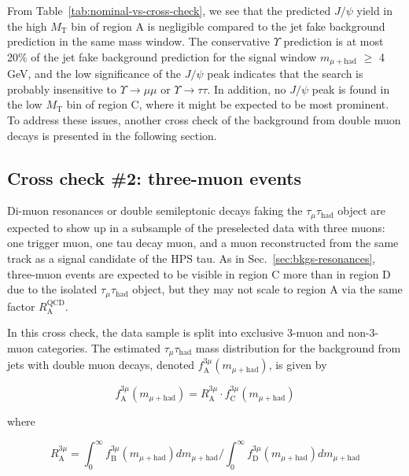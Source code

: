 From Table~\ref{tab:nominal-vs-cross-check}, we see that the predicted $J\slash\psi$ yield in the high $M_{\text{T}}$ bin of region A is negligible compared to the jet fake background prediction in the same mass window.  The conservative $\Upsilon$ prediction is at most 20\% of the jet fake background prediction for the signal window $m_{\mu+\text{had}}$ $\geq$ 4 GeV, and the low significance of the $J\slash\psi$ peak indicates that the search is probably insensitive to $\Upsilon\rightarrow\mu\mu$ or $\Upsilon\rightarrow\tau\tau$.  In addition, no $J\slash\psi$ peak is found in the low $M_{\text{T}}$ bin of region C, where it might be expected to be most prominent.  To address these issues, another cross check of the background from double muon decays is presented in the following section.

\subsection{Cross check \#2: three-muon events\label{sec:bkgs-3-muon}}

Di-muon resonances or double semileptonic decays faking the $\tau_{\mu}\tau_{\text{had}}$ object are expected to show up in a subsample of the preselected data with three muons: one trigger muon, one tau decay muon, and a muon reconstructed from the same track as a signal candidate of the HPS tau.  As in Sec.~\ref{sec:bkgs-resonances}, three-muon events are expected to be visible in region C more than in region D due to the isolated $\tau_{\mu}\tau_{\text{had}}$ object, but they may not scale to region A via the same factor $R_{\text{A}}^{\text{QCD}}$.

In this cross check, the data sample is split into exclusive 3-muon and non-3-muon categories.  The estimated $\tau_{\mu}\tau_{\text{had}}$ mass distribution for the background from jets with double muon decays, denoted $f_{\text{A}}^{3\mu}(m_{\mu+\text{had}})$, is given by

\begin{equation}
\label{eq:f-A-3mu}
f_{\text{A}}^{3\mu}(m_{\mu+\text{had}}) = R_{\text{A}}^{3\mu}\cdot f_{\text{C}}^{3\mu}(m_{\mu+\text{had}})
\end{equation}

where

\begin{equation}
\label{eq:R-A-3mu}
R_{\text{A}}^{3\mu} = \int_{0}^{\infty}f_{\text{B}}^{3\mu}(m_{\mu+\text{had}})dm_{\mu+\text{had}}/\int_{0}^{\infty}f_{\text{D}}^{3\mu}(m_{\mu+\text{had}})dm_{\mu+\text{had}}
\end{equation}

